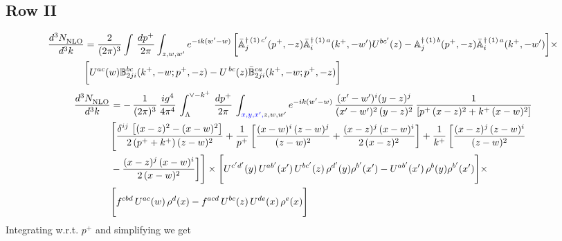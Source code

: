 \documentclass[9pt]{article}
\def\mf#1{\mathbb{#1}}
\numberwithin{equation}{section}
\begin{document}
\subsection{Row II\,}
\begin{align}
    \frac{d^{3}N_{\rm NLO}^{\rm}}{d^{3}k}  & =    \frac{2}{(2\pi)^{3}} \int\, \frac{dp^{+}}{2\pi}\int_{z,w,w^{\prime}} e^{-ik(w^{\prime}-w)}\,\bigg[\Bar{\mf{A}}^{\dagger\,(1)\, c^{\prime}}_{j}(p^{+},-z)\Bar{\mf{A}}^{\dagger\, (1)\, a}_{i}(k^{+},- w^{\prime})U^{bc^{\prime}}(z) - \mf{A}^{\dagger\, (1)\, b}_{j}(p^{+},- z)\Bar{\mf{A}}^{\dagger\, (1)\, a}_{i}(k^{+},- w^{\prime})\bigg] \times \notag \\ & \bigg[U^{ac}(w) \mf{B}^{bc}_{2ji}(k^{+},-w;p^{+},-z) -U^{\, bc}(z)\Bar{\mf{B}}^{ca}_{2ji}(k^{+},-w; p^{+},-z)\bigg] \nonumber
\end{align}
\begin{align}
    \frac{d^{3}N_{\rm NLO}^{\rm}}{d^{3}k}  & =  -\,\frac{1}{(2\pi)^{3}}\,\frac{ig^{4}}{4\pi^{4}}\,\int_{\Lambda}^{\vee-k^{+}}\,\frac{dp^{+}}{2\pi}\, \int_{{\color{blue}x,y,x^{\prime},} z,w,w^{\prime}} e^{-ik(w^{\prime}-w)}\, \frac{(x'-w')^{i}(y-z)^{j}}{(x'-w')^{2}\,(y-z)^{2}}\, \frac{1}{\left[p^{+}\,(x-z)^{2}+k^{+}\,(x-w)^{2}\right]}\notag \\ & \Bigg[\frac{\delta^{ij}\, \left[(x-z)^{2}-(x-w)^{2}\right]}{2\, (p^{+}+k^{+})\,(z-w)^{2}}+\frac{1}{p^{+}}\, \bigg[\frac{(x-w)^{i}\,(z-w)^{j}}{(z-w)^{2}}+\frac{(x-z)^{j}\,(x-w)^{i}}{2\,(x-z)^{2}}\bigg]+\frac{1}{k^{+}}\,\bigg[\frac{(x-z)^{j}\,(z-w)^{i}}{(z-w)^{2}}\notag \\ & -\frac{(x-z)^{j}\,(x-w)^{i}}{2\,(x-w)^{2}}\bigg]\Bigg]\times \Bigg[U^{c'd'}(y)\,U^{ab'}(x')\,U^{bc'}(z)\,\rho^{d'}(y)\rho^{b'}(x')-U^{ab'}(x')\,\rho^{b}(y)\rho^{b'}(x')\Bigg]\times \notag \\ & \Bigg[f^{cbd}\,U^{ac}(w)\,\rho^{d}(x)-f^{acd}\, U^{bc}(z)\,U^{de}(x)\,\rho^{e}(x)\Bigg]
\end{align}
Integrating w.r.t. $p^{+}$ and simplifying we get
\end{document}
